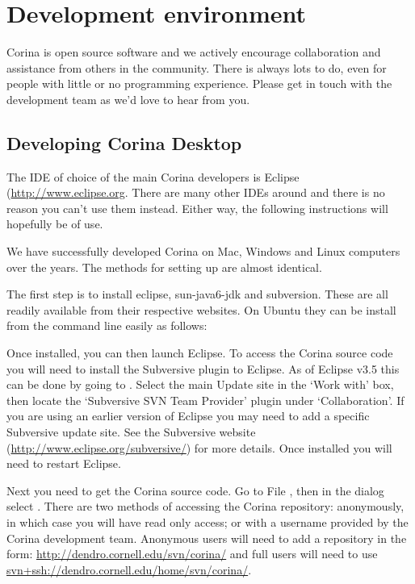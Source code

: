 \chapter{Development environment}
Corina is open source software and we actively encourage collaboration and assistance from others in the community.  There is always lots to do, even for people with little or no programming experience.  Please get in touch with the development team as we'd love to hear from you.

\section{Developing Corina Desktop}
The IDE of choice of the main Corina developers is Eclipse (\url{http://www.eclipse.org}. There are many other IDEs around and there is no reason you can't use them instead.  Either way, the following instructions will hopefully be of use.

We have successfully developed Corina on Mac, Windows and Linux computers over the years.  The methods for setting up are almost identical.  

The first step is to install eclipse, sun-java6-jdk and subversion.  These are all readily available from their respective websites.  On Ubuntu they can be install from the command line easily as follows:


Once installed, you can then launch Eclipse.  To access the Corina source code you will need to install the Subversive plugin to Eclipse.  As of Eclipse v3.5 this can be done by going to .  Select the main Update site in the `Work with' box, then locate the `Subversive SVN Team Provider' plugin under `Collaboration'.  If you are using an earlier version of Eclipse you may need to add a specific Subversive update site.  See the Subversive website (\url{http://www.eclipse.org/subversive/}) for more details.  Once installed you will need to restart Eclipse.

Next you need to get the Corina source code.  Go to File , then in the dialog select .  There are two methods of accessing the Corina repository: anonymously, in which case you will have read only access; or with a username provided by the Corina development team.  Anonymous users will need to add a repository in the form: \url{http://dendro.cornell.edu/svn/corina/} and full users will need to use \url{svn+ssh://dendro.cornell.edu/home/svn/corina/}.

